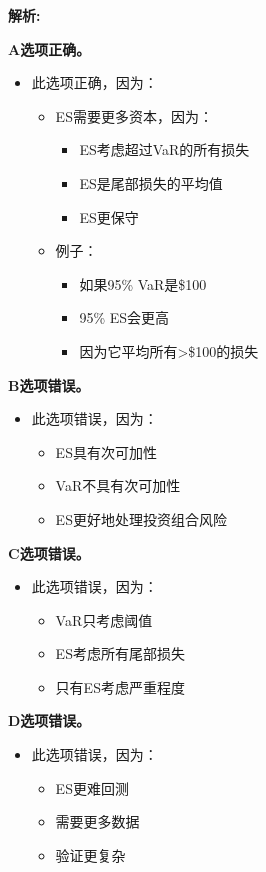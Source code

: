 \documentclass{article}
\newenvironment{explanation}
{\textbf{解析:}\par}
{\par}
\begin{document}
\begin{explanation}
    \textbf{A选项正确。}
    \begin{itemize}
        \item 此选项正确，因为：
        \begin{itemize}
            \item ES需要更多资本，因为：
            \begin{itemize}
                \item ES考虑超过VaR的所有损失
                \item ES是尾部损失的平均值
                \item ES更保守
            \end{itemize}
            \item 例子：
            \begin{itemize}
                \item 如果95\% VaR是\$100
                \item 95\% ES会更高
                \item 因为它平均所有>\$100的损失
            \end{itemize}
        \end{itemize}
    \end{itemize}
    \textbf{B选项错误。}
    \begin{itemize}
        \item 此选项错误，因为：
        \begin{itemize}
            \item ES具有次可加性
            \item VaR不具有次可加性
            \item ES更好地处理投资组合风险
        \end{itemize}
    \end{itemize}
    \textbf{C选项错误。}
    \begin{itemize}
        \item 此选项错误，因为：
        \begin{itemize}
            \item VaR只考虑阈值
            \item ES考虑所有尾部损失
            \item 只有ES考虑严重程度
        \end{itemize}
    \end{itemize}
    \textbf{D选项错误。}
    \begin{itemize}
        \item 此选项错误，因为：
        \begin{itemize}
            \item ES更难回测
            \item 需要更多数据
            \item 验证更复杂
        \end{itemize}
    \end{itemize}
\end{explanation}
\end{document}
